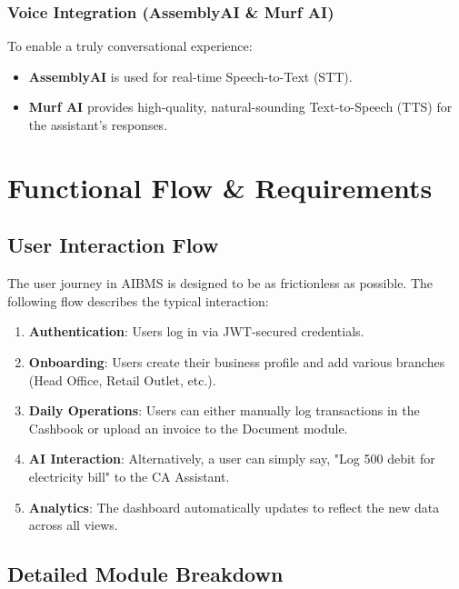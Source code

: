 \documentclass[12pt,a4paper]{report}
\begin{document}
\subsection{Voice Integration (AssemblyAI \& Murf AI)}
To enable a truly conversational experience:
\begin{itemize}
    \item \textbf{AssemblyAI} is used for real-time Speech-to-Text (STT).
    \item \textbf{Murf AI} provides high-quality, natural-sounding Text-to-Speech (TTS) for the assistant's responses.
\end{itemize}

\chapter{Functional Flow \& Requirements}

\section{User Interaction Flow}
The user journey in AIBMS is designed to be as frictionless as possible. The following flow describes the typical interaction:

\begin{enumerate}
    \item \textbf{Authentication}: Users log in via JWT-secured credentials.
    \item \textbf{Onboarding}: Users create their business profile and add various branches (Head Office, Retail Outlet, etc.).
    \item \textbf{Daily Operations}: Users can either manually log transactions in the Cashbook or upload an invoice to the Document module.
    \item \textbf{AI Interaction}: Alternatively, a user can simply say, "Log 500 debit for electricity bill" to the CA Assistant.
    \item \textbf{Analytics}: The dashboard automatically updates to reflect the new data across all views.
\end{enumerate}

\section{Detailed Module Breakdown}
\end{document}
